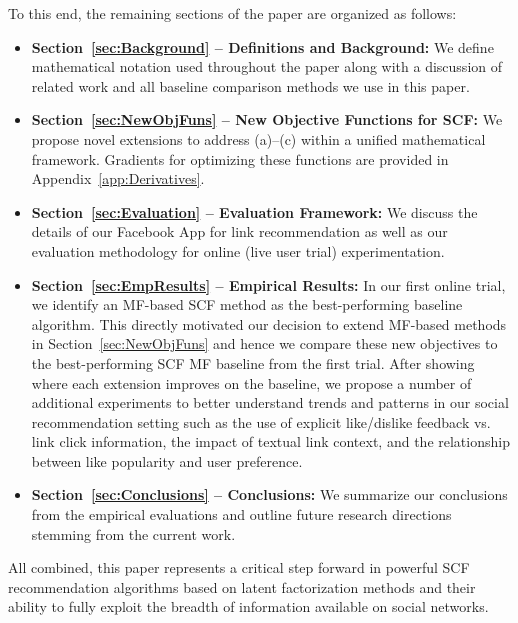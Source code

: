 To this end, the remaining sections of the paper are organized as follows:
\begin{itemize}
\item {\bf Section~\ref{sec:Background} -- Definitions and Background:} 
We define mathematical notation used throughout the paper along
with a discussion of related work and all baseline comparison methods
we use in this paper.
\item {\bf Section~\ref{sec:NewObjFuns} -- New Objective Functions for
SCF:} We propose novel extensions to address (a)--(c) within a unified
mathematical framework.  Gradients for optimizing these functions
are provided in Appendix~\ref{app:Derivatives}.
\item {\bf Section~\ref{sec:Evaluation} -- Evaluation Framework:} We
discuss the details of our Facebook App for link
recommendation as well as our evaluation methodology for 
online (live user trial) experimentation.  
\item {\bf Section~\ref{sec:EmpResults} -- Empirical Results:} In our
first online trial, we identify an MF-based SCF method as the
best-performing baseline algorithm.  This directly motivated our
decision to extend MF-based methods in Section~\ref{sec:NewObjFuns}
and hence we compare these new objectives to the best-performing SCF
MF baseline from the first trial.  After showing where each extension
improves on the baseline, we propose a number of additional
experiments to better understand trends and patterns in our social
recommendation setting such as the use of explicit like/dislike
feedback vs. link click information, the impact of textual link
context, and the relationship between like
popularity and user preference.
\item {\bf Section~\ref{sec:Conclusions} -- Conclusions:} We summarize
our conclusions from the empirical evaluations and outline 
future research directions stemming from the current work.
\end{itemize}

All combined, this paper represents a critical step forward in
powerful SCF recommendation algorithms based on latent factorization
methods and their ability to fully exploit the breadth of information
available on social networks.
